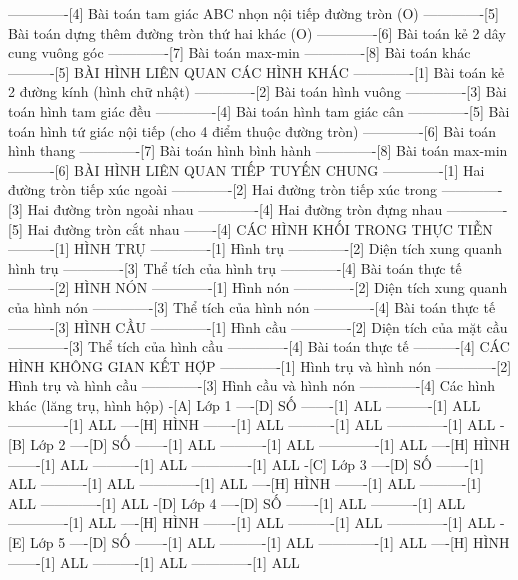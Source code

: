 -------------[4] Bài toán tam giác ABC nhọn nội tiếp đường tròn (O)
-------------[5] Bài toán dựng thêm đường tròn thứ hai khác (O)
-------------[6] Bài toán kẻ 2 dây cung vuông góc
-------------[7] Bài toán max-min
-------------[8] Bài toán khác
----------[5] BÀI HÌNH LIÊN QUAN CÁC HÌNH KHÁC
-------------[1] Bài toán kẻ 2 đường kính (hình chữ nhật)
-------------[2] Bài toán hình vuông
-------------[3] Bài toán hình tam giác đều
-------------[4] Bài toán hình tam giác cân
-------------[5] Bài toán hình tứ giác nội tiếp (cho 4 điểm thuộc đường tròn)
-------------[6] Bài toán hình thang
-------------[7] Bài toán hình bình hành
-------------[8] Bài toán max-min
----------[6] BÀI HÌNH LIÊN QUAN TIẾP TUYẾN CHUNG
-------------[1] Hai đường tròn tiếp xúc ngoài
-------------[2] Hai đường tròn tiếp xúc trong
-------------[3] Hai đường tròn ngoài nhau
-------------[4] Hai đường tròn đựng nhau
-------------[5] Hai đường tròn cắt nhau
-------[4] CÁC HÌNH KHỐI TRONG THỰC TIỄN
----------[1] HÌNH TRỤ
-------------[1] Hình trụ
-------------[2] Diện tích xung quanh hình trụ
-------------[3] Thể tích của hình trụ
-------------[4] Bài toán thực tế
----------[2] HÌNH NÓN
-------------[1] Hình nón
-------------[2] Diện tích xung quanh của hình nón
-------------[3] Thể tích của hình nón
-------------[4] Bài toán thực tế
----------[3] HÌNH CẦU
-------------[1] Hình cầu
-------------[2] Diện tích của mặt cầu
-------------[3] Thể tích của hình cầu
-------------[4] Bài toán thực tế
----------[4] CÁC HÌNH KHÔNG GIAN KẾT HỢP
-------------[1] Hình trụ và hình nón
-------------[2] Hình trụ và hình cầu
-------------[3] Hình cầu và hình nón
-------------[4] Các hình khác (lăng trụ, hình hộp)
-[A] Lớp 1
----[D] SỐ
-------[1] ALL
----------[1] ALL
-------------[1] ALL
----[H] HÌNH
-------[1] ALL
----------[1] ALL
-------------[1] ALL
-[B] Lớp 2
----[D] SỐ
-------[1] ALL
----------[1] ALL
-------------[1] ALL
----[H] HÌNH
-------[1] ALL
----------[1] ALL
-------------[1] ALL
-[C] Lớp 3
----[D] SỐ
-------[1] ALL
----------[1] ALL
-------------[1] ALL
----[H] HÌNH
-------[1] ALL
----------[1] ALL
-------------[1] ALL
-[D] Lớp 4
----[D] SỐ
-------[1] ALL
----------[1] ALL
-------------[1] ALL
----[H] HÌNH
-------[1] ALL
----------[1] ALL
-------------[1] ALL
-[E] Lớp 5
----[D] SỐ
-------[1] ALL
----------[1] ALL
-------------[1] ALL
----[H] HÌNH
-------[1] ALL
----------[1] ALL
-------------[1] ALL
